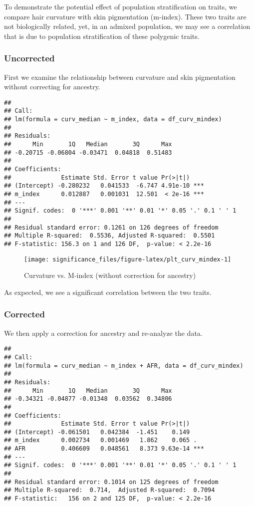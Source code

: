 \documentclass[
]{article}
\begin{document}
To demonstrate the potential effect of population stratification on
traits, we compare hair curvature with skin pigmentation (m-index).
These two traits are not biologically related, yet, in an admixed
population, we may see a correlation that is due to population
stratification of these polygenic traits.

\hypertarget{uncorrected-1}{%
\subsubsection{Uncorrected}\label{uncorrected-1}}

First we examine the relationship between curvature and skin
pigmentation without correcting for ancestry.

\begin{verbatim}
## 
## Call:
## lm(formula = curv_median ~ m_index, data = df_curv_mindex)
## 
## Residuals:
##      Min       1Q   Median       3Q      Max 
## -0.20715 -0.06804 -0.03471  0.04818  0.51483 
## 
## Coefficients:
##              Estimate Std. Error t value Pr(>|t|)    
## (Intercept) -0.280232   0.041533  -6.747 4.91e-10 ***
## m_index      0.012887   0.001031  12.501  < 2e-16 ***
## ---
## Signif. codes:  0 '***' 0.001 '**' 0.01 '*' 0.05 '.' 0.1 ' ' 1
## 
## Residual standard error: 0.1261 on 126 degrees of freedom
## Multiple R-squared:  0.5536, Adjusted R-squared:  0.5501 
## F-statistic: 156.3 on 1 and 126 DF,  p-value: < 2.2e-16
\end{verbatim}

\begin{figure}
\texttt{[image: significance\_files/figure-latex/plt\_curv\_mindex-1]} \caption{Curvature vs. M-index (without correction for ancestry)}\label{fig:plt_curv_mindex}
\end{figure}

As expected, we see a significant correlation between the two traits.

\hypertarget{corrected-1}{%
\subsubsection{Corrected}\label{corrected-1}}

We then apply a correction for ancestry and re-analyze the data.

\begin{verbatim}
## 
## Call:
## lm(formula = curv_median ~ m_index + AFR, data = df_curv_mindex)
## 
## Residuals:
##      Min       1Q   Median       3Q      Max 
## -0.34321 -0.04877 -0.01348  0.03562  0.34806 
## 
## Coefficients:
##              Estimate Std. Error t value Pr(>|t|)    
## (Intercept) -0.061501   0.042384  -1.451    0.149    
## m_index      0.002734   0.001469   1.862    0.065 .  
## AFR          0.406609   0.048561   8.373 9.63e-14 ***
## ---
## Signif. codes:  0 '***' 0.001 '**' 0.01 '*' 0.05 '.' 0.1 ' ' 1
## 
## Residual standard error: 0.1014 on 125 degrees of freedom
## Multiple R-squared:  0.714,  Adjusted R-squared:  0.7094 
## F-statistic:   156 on 2 and 125 DF,  p-value: < 2.2e-16
\end{verbatim}
\end{document}
